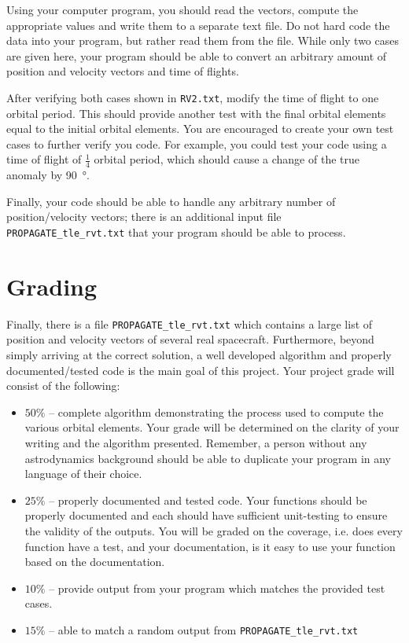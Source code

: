 \documentclass[11pt, reqno]{article}    %
\begin{document}
Using your computer program, you should read the vectors, compute the appropriate values and write them to a separate text file.
Do not hard code the data into your program, but rather read them from the file. 
While only two cases are given here, your program should be able to convert an arbitrary amount of position and velocity vectors and time of flights.

After verifying both cases shown in \texttt{RV2.txt}, modify the time of flight to one orbital period. 
This should provide another test with the final orbital elements equal to the initial orbital elements. 
You are encouraged to create your own test cases to further verify you code. 
For example, you could test your code using a time of flight of \( \frac{1}{4} \) orbital period, which should cause a change of the true anomaly by \SI{90}{\degree}.

Finally, your code should be able to handle any arbitrary number of position/velocity vectors; there is an additional input file \texttt{PROPAGATE\_tle\_rvt.txt} that your program should be able to process.

\section*{Grading}
Finally, there is a file \texttt{PROPAGATE\_tle\_rvt.txt} which contains a large list of position and velocity vectors of several real spacecraft. 
Furthermore, beyond simply arriving at the correct solution, a well developed algorithm and properly documented/tested code is the main goal of this project.
Your project grade will consist of the following:
\begin{itemize}
    \item \( 50 \% \) -- complete algorithm demonstrating the process used to compute the various orbital elements. 
        Your grade will be determined on the clarity of your writing and the algorithm presented. 
        Remember, a person without any astrodynamics background should be able to duplicate your program in any language of their choice.
    \item \( 25 \% \) -- properly documented and tested code. 
        Your functions should be properly documented and each should have sufficient unit-testing to ensure the validity of the outputs. 
        You will be graded on the coverage, i.e. does every function have a test, and your documentation, is it easy to use your function based on the documentation.
    \item \( 10 \% \) -- provide output from your program which matches the provided test cases.
    \item \( 15 \% \) -- able to match a random output from \texttt{PROPAGATE\_tle\_rvt.txt}
\end{itemize}
\end{document}
